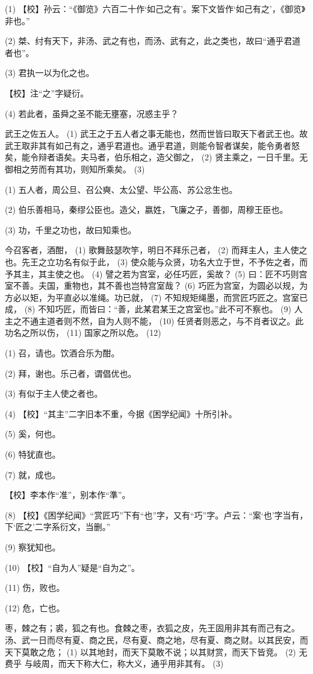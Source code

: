 \documentclass[12pt,UTF8]{ctexbook}
\begin{document}
(1) 【校】孙云：“《御览》六百二十作‘如己之有’。案下文皆作‘如己有之’，《御览》非也。”

(2) 桀、纣有天下，非汤、武之有也，而汤、武有之，此之类也，故曰“通乎君道者也”。

(3) 君执一以为化之也。

【校】注“之”字疑衍。

(4) 若此者，虽舜之圣不能无壅塞，况惑主乎？

武王之佐五人。 (1) 武王之于五人者之事无能也，然而世皆曰取天下者武王也。故武王取非其有如己有之，通乎君道也。通乎君道，则能令智者谋矣，能令勇者怒矣，能令辩者语矣。夫马者，伯乐相之，造父御之， (2) 贤主乘之，一日千里。无御相之劳而有其功，则知所乘矣。 (3)

(1) 五人者，周公旦、召公奭、太公望、毕公高、苏公忿生也。

(2) 伯乐善相马，秦缪公臣也。造父，嬴姓，飞廉之子，善御，周穆王臣也。

(3) 功，千里之功也，故曰知乘也。

今召客者，酒酣， (1) 歌舞鼓瑟吹竽，明日不拜乐己者， (2) 而拜主人，主人使之也。先王之立功名有似于此， (3) 使众能与众贤，功名大立于世，不予佐之者，而予其主，其主使之也。 (4) 譬之若为宫室，必任巧匠，奚故？ (5) 曰：匠不巧则宫室不善。夫国，重物也，其不善也岂特宫室哉？ (6) 巧匠为宫室，为圆必以规，为方必以矩，为平直必以准绳。功已就， (7) 不知规矩绳墨，而赏匠巧匠之。宫室已成， (8) 不知巧匠，而皆曰：“善，此某君某王之宫室也。”此不可不察也。 (9) 人主之不通主道者则不然，自为人则不能， (10) 任贤者则恶之，与不肖者议之。此功名之所以伤， (11) 国家之所以危。 (12)

(1) 召，请也。饮酒合乐为酣。

(2) 拜，谢也。乐己者，谓倡优也。

(3) 有似于主人使之者也。

(4) 【校】“其主”二字旧本不重，今据《困学纪闻》十所引补。

(5) 奚，何也。

(6) 特犹直也。

(7) 就，成也。

【校】李本作“准”，别本作“準”。

(8) 【校】《困学纪闻》“赏匠巧”下有“也”字，又有“巧”字。卢云：“案‘也’字当有，下‘匠之’二字系衍文，当删。”

(9) 察犹知也。

(10) 【校】“自为人”疑是“自为之”。

(11) 伤，败也。

(12) 危，亡也。

枣，棘之有；裘，狐之有也。食棘之枣，衣狐之皮，先王固用非其有而己有之。汤、武一日而尽有夏、商之民，尽有夏、商之地，尽有夏、商之财。以其民安，而天下莫敢之危； (1) 以其地封，而天下莫敢不说；以其财赏，而天下皆竞。 (2) 无费乎 与岐周，而天下称大仁，称大义，通乎用非其有。 (3)
\end{document}
